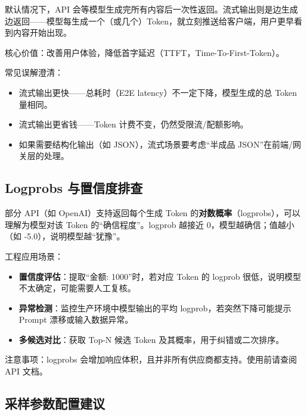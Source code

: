 \documentclass[10pt,a4paper]{ctexart}
\begin{document}
默认情况下，API 会等模型生成完所有内容后一次性返回。流式输出则是边生成边返回——模型每生成一个（或几个）Token，就立刻推送给客户端，用户更早看到内容开始出现。



核心价值：改善用户体验，降低首字延迟（TTFT，Time-To-First-Token）。



常见误解澄清：


\begin{itemize}[itemsep=2pt, topsep=4pt]
  \item 流式输出更快——总耗时（E2E latency）不一定下降，模型生成的总 Token 量相同。
  \item 流式输出更省钱——Token 计费不变，仍然受限流/配额影响。
  \item 如果需要结构化输出（如 JSON），流式场景要考虑“半成品 JSON”在前端/网关层的处理。
\end{itemize}


\subsection{Logprobs 与置信度排查}


部分 API（如 OpenAI）支持返回每个生成 Token 的\textbf{对数概率}（logprobs），可以理解为模型对该 Token 的“确信程度”。logprob 越接近 0，模型越确信；值越小（如 -5.0），说明模型越“犹豫”。



工程应用场景：


\begin{itemize}[itemsep=2pt, topsep=4pt]
  \item \textbf{置信度评估}：提取“金额: 1000”时，若对应 Token 的 logprob 很低，说明模型不太确定，可能需要人工复核。
  \item \textbf{异常检测}：监控生产环境中模型输出的平均 logprob，若突然下降可能提示 Prompt 漂移或输入数据异常。
  \item \textbf{多候选对比}：获取 Top-N 候选 Token 及其概率，用于纠错或二次排序。
\end{itemize}


注意事项：logprobs 会增加响应体积，且并非所有供应商都支持。使用前请查阅 API 文档。



\subsection{采样参数配置建议}
\end{document}
